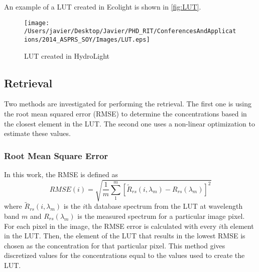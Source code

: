 An example of a LUT created in Ecolight is shown in \autoref{fig:LUT}. 

\begin{figure}[htb]
    \centering
      \texttt{[image: /Users/javier/Desktop/Javier/PHD\_RIT/ConferencesAndApplications/2014\_ASPRS\_SOY/Images/LUT.eps]}
      \caption{LUT created in HydroLight}
      \label{fig:LUT}
\end{figure}




\subsection{Retrieval}
Two methods are investigated for performing the retrieval. The first one is using the root mean squared error (RMSE) to determine the concentrations based in the closest element in the LUT. The second one uses a non-linear optimization to estimate these values.
\subsubsection{Root Mean Square Error}
In this work, the RMSE is defined as
\begin{equation}
  RMSE(i) = \sqrt{\frac{1}{m}\sum_1^m\left[\widetilde{R}_{rs}(i,\lambda_m)-R_{rs}(\lambda_m)\right]^2}
\end{equation}
where $\widetilde{R}_{rs}(i,\lambda_m)$ is the $i$th database spectrum from the LUT at wavelength band $m$ and $R_{rs}(\lambda_m)$ is the measured spectrum for a particular image pixel. For each pixel in the image, the RMSE error is calculated with every $i$th element in the LUT. Then, the element of the LUT that results in the lowest RMSE is chosen as the concentration for that particular pixel. This method gives discretized values for the concentrations equal to the values used to create the LUT.

